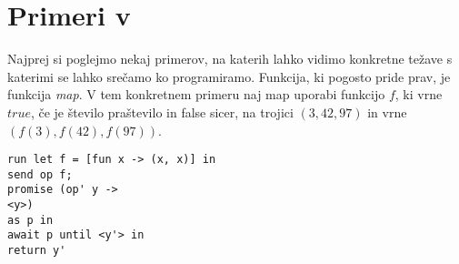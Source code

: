 \section{Primeri v \aeff{}} \label{sec:primeri-aeff}

Najprej si poglejmo nekaj primerov, na katerih lahko vidimo konkretne težave s katerimi se lahko srečamo ko programiramo. 
Funkcija, ki pogosto pride prav, je funkcija \emph{map}. V tem konkretnem primeru naj map uporabi funkcijo $f$, ki vrne $true$, če je število praštevilo in false sicer, na trojici $(3,42,97)$ in vrne $(f(3),f(42),f(97))$.  

\begin{lstlisting}[caption={TODO},label={prog:primer-map-seq}]
run let f = [fun x -> (x, x)] in
send op f;
promise (op' y -> 
<y>)
as p in
await p until <y'> in
return y'

\end{lstlisting}